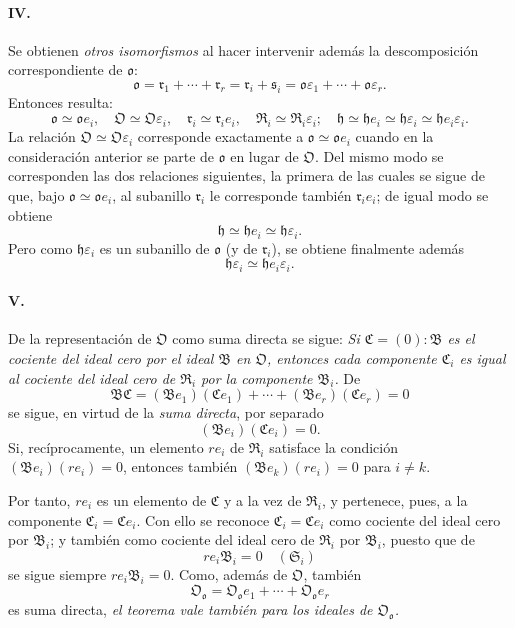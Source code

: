 \paragraph{IV.}
Se obtienen \emph{otros isomorfismos} al hacer intervenir además la descomposición correspondiente de $\mathfrak o$:
\[
\mathfrak o=\mathfrak r_1+\cdots+\mathfrak r_r
=\mathfrak r_i+\mathfrak s_i
=\mathfrak o\varepsilon_1+\cdots+\mathfrak o\varepsilon_r.
\]
Entonces resulta:
\[
\mathfrak o\simeq\mathfrak o e_i,
\quad \mathfrak O\simeq\mathfrak O\varepsilon_i,
\quad \mathfrak r_i\simeq\mathfrak r_i e_i,
\quad \mathfrak R_i\simeq\mathfrak R_i\varepsilon_i;
\quad \mathfrak h\simeq\mathfrak h e_i\simeq\mathfrak h\varepsilon_i\simeq\mathfrak h e_i\varepsilon_i.
\]
La relación $\mathfrak O\simeq\mathfrak O\varepsilon_i$ corresponde exactamente a $\mathfrak o\simeq\mathfrak o e_i$ cuando en la consideración anterior se parte de $\mathfrak o$ en lugar de $\mathfrak O$. Del mismo modo se corresponden las dos relaciones siguientes, la primera de las cuales se sigue de que, bajo $\mathfrak o\simeq\mathfrak o e_i$, al subanillo $\mathfrak r_i$ le corresponde también $\mathfrak r_i e_i$; de igual modo se obtiene
\[
\mathfrak h\simeq\mathfrak h e_i\simeq\mathfrak h\varepsilon_i.
\]
Pero como $\mathfrak h\varepsilon_i$ es un subanillo de $\mathfrak o$ (y de $\mathfrak r_i$), se obtiene finalmente además
\[
\mathfrak h\varepsilon_i\simeq\mathfrak h e_i\varepsilon_i.
\]

\paragraph{V.}
De la representación de $\mathfrak O$ como suma directa se sigue: \emph{Si $\mathfrak C=(0):\mathfrak B$ es el cociente del ideal cero por el ideal $\mathfrak B$ en $\mathfrak O$, entonces cada componente $\mathfrak C_i$ es igual al cociente del ideal cero de $\mathfrak R_i$ por la componente $\mathfrak B_i$.} De
\[
\mathfrak B\mathfrak C=(\mathfrak B e_1)(\mathfrak C e_1)+\cdots+(\mathfrak B e_r)(\mathfrak C e_r)=0
\]
se sigue, en virtud de la \emph{suma directa}, por separado
\[
(\mathfrak B e_i)(\mathfrak C e_i)=0.
\]
Si, recíprocamente, un elemento $r e_i$ de $\mathfrak R_i$ satisface la condición $(\mathfrak B e_i)(r e_i)=0$, entonces también $(\mathfrak B e_k)(r e_i)=0$ para $i\ne k$.

Por tanto, $r e_i$ es un elemento de $\mathfrak C$ y a la vez de $\mathfrak R_i$, y pertenece, pues, a la componente $\mathfrak C_i=\mathfrak C e_i$. Con ello se reconoce $\mathfrak C_i=\mathfrak C e_i$ como cociente del ideal cero por $\mathfrak B_i$; y también como cociente del ideal cero de $\mathfrak R_i$ por $\mathfrak B_i$, puesto que de
\[
r e_i\mathfrak B_i=0\quad(\mathfrak S_i)
\]
se sigue siempre $r e_i\mathfrak B_i=0$. Como, además de $\mathfrak O$, también
\[
\mathfrak O_{\mathfrak o}=\mathfrak O_{\mathfrak o}e_1+\cdots+\mathfrak O_{\mathfrak o}e_r
\]
es suma directa, \emph{el teorema vale también para los ideales de $\mathfrak O_{\mathfrak o}$.}

